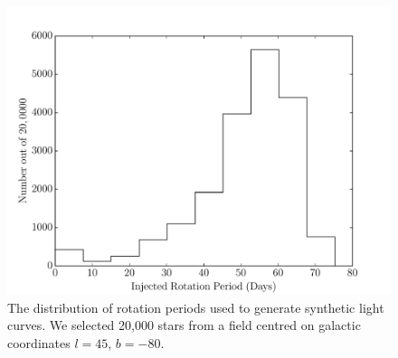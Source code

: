 \begin{figure}
\begin{center}
\includegraphics[width=6in, clip=true]{figures/trilegal_period_hist-80.pdf}
\caption[The period distribution for stars used in \LSST\
simulations]
{The distribution of rotation periods used to generate synthetic light curves.
We selected 20,000 stars from a field centred on galactic coordinates $l=45$,
$b=-80$.}
\label{fig:trilegal_period_hist}
\end{center}
\end{figure}

